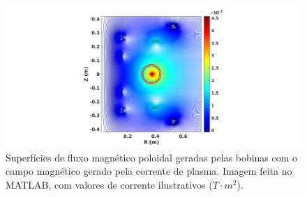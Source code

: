 \documentclass[12pt,oneside,a4paper]{abntex2}
\begin{document}
\begin{figure}[H]
\centering
\includegraphics[scale=0.5]{campo002-2.png} 
\caption{Superfícies de fluxo magnético poloidal geradas pelas bobinas com o campo magnético gerado pela corrente de plasma. Imagem feita no MATLAB, com valores de corrente ilustrativos ($T \cdot m^2$).}
\label{fig: equipotenc2}
\end{figure}
\end{document}
